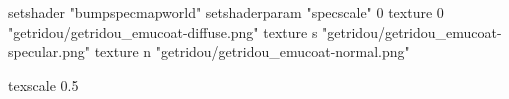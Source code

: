 setshader "bumpspecmapworld"
setshaderparam "specscale" 0
texture 0 "getridou/getridou_emucoat-diffuse.png"
texture s "getridou/getridou_emucoat-specular.png"
texture n "getridou/getridou_emucoat-normal.png"

texscale 0.5
